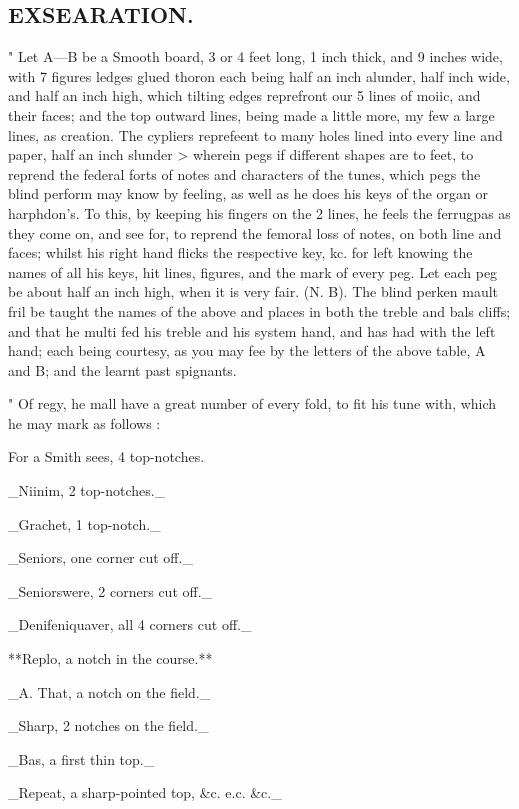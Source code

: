 \subsection*{EXSEARATION.}
" Let A—B be a Smooth board, 3 or 4 feet long, 1 inch thick, and 9 inches wide, with 7 figures ledges glued thoron each being half an inch alunder, half inch wide, and half an inch high, which tilting edges reprefront our 5 lines of moiic, and their faces; and the top outward lines, being made a little more, my few a large lines, as creation. The cypliers reprefeent to many holes lined into every line and paper, half an inch slunder > wherein pegs if different shapes are to feet, to reprend the federal forts of notes and characters of the tunes, which pegs the blind perform may know by feeling, as well as he does his keys of the organ or harphdon’s. To this, by keeping his fingers on the 2 lines, he feels the ferrugpas as they come on, and see for, to reprend the femoral loss of notes, on both line and faces; whilst his right hand flicks the respective key, kc. for left knowing the names of all his keys, hit lines, figures, and the mark of every peg. Let each peg be about half an inch high, when it is very fair. (N. B). The blind perken mault fril be taught the names of the above and places in both the treble and bals cliffs; and that he multi fed his treble and his system hand, and has had with the left hand; each being courtesy, as you may fee by the letters of the above table, A and B; and the learnt past spignants.\par\medskip
" Of regy, he mall have a great number of every fold, to fit his tune with, which he may mark as follows :\par\medskip
For a Smith sees, 4 top-notches.\par\medskip
\_Niinim, 2 top-notches.\_\par\medskip
\_Grachet, 1 top-notch.\_\par\medskip
\_Seniors, one corner cut off.\_\par\medskip
\_Seniorswere, 2 corners cut off.\_\par\medskip
\_Denifeniquaver, all 4 corners cut off.\_\par\medskip
**Replo, a notch in the course.**\par\medskip
\_A. That, a notch on the field.\_\par\medskip
\_Sharp, 2 notches on the field.\_\par\medskip
\_Bas, a first thin top.\_\par\medskip
\_Repeat, a sharp-pointed top, \&c. e.c. \&c.\_\par\medskip
